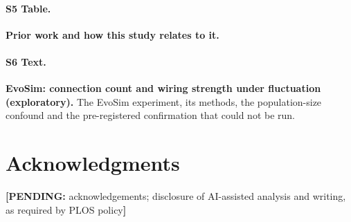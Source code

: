\documentclass[10pt,letterpaper]{article}
\newcommand{\pending}[1]{{\color{pend}\textbf{[PENDING:} #1\textbf{]}}}
\begin{document}
\paragraph*{S5 Table.}
\label{S5_Table}
{\bf Prior work and how this study relates to it.}

\paragraph*{S6 Text.}
\label{S6_Text}
{\bf EvoSim: connection count and wiring strength under fluctuation
(exploratory).} The EvoSim experiment, its methods, the population-size
confound and the pre-registered confirmation that could not be run.

\section*{Acknowledgments}
\pending{acknowledgements; disclosure of AI-assisted analysis and writing, as
required by PLOS policy}

\nolinenumbers

\end{document}
